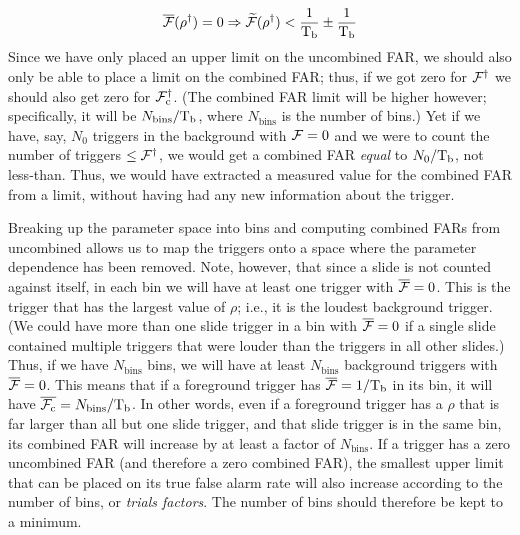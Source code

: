 \begin{equation}
\label{eqn:zeroFAR}
\overline{\far}(\rho^\dagger) = 0 \Rightarrow \widetilde{\far}(\rho^\dagger) < \frac{1}{\Tb} \pm \frac{1}{\Tb}
\end{equation}
Since we have only placed an upper limit on the uncombined \ac{FAR}, we should also only be able to place a limit on the combined \ac{FAR}; thus, if we got zero for $\mathcal{F}^\dagger$ we should also get zero for $\mathcal{F}_{\mathrm{c}}^\dagger$. (The combined \ac{FAR} limit will be higher however; specifically, it will be $N_{\mathrm{bins}}/\mathrm{T_b}$, where $N_{\mathrm{bins}}$ is the number of bins.) Yet if we have, say, $N_0$ triggers in the background with $\mathcal{F} = 0$ and we were to count the number of triggers $\leq \mathcal{F}^\dagger$, we would get a combined \ac{FAR} \emph{equal} to $N_0/\mathrm{T_b}$, not less-than. Thus, we would have extracted a measured value for the combined \ac{FAR} from a limit, without having had any new information about the trigger.

Breaking up the parameter space into bins and computing combined \acp{FAR} from uncombined allows us to map the triggers onto a space where the parameter dependence has been removed. Note, however, that since a slide is not counted against itself, in each bin we will have at least one trigger with $\overline{\mathcal{F}} = 0$. This is the trigger that has the largest value of $\rho$; i.e., it is the loudest background trigger. (We could have more than one slide trigger in a bin with $\overline{\mathcal{F}} = 0$ if a single slide contained multiple triggers that were louder than the triggers in all other slides.) Thus, if we have $N_{\mathrm{bins}}$ bins, we will have at least $N_{\mathrm{bins}}$ background triggers with $\overline{\mathcal{F}} = 0$. This means that if a foreground trigger has $\overline{\mathcal{F}} = 1/\mathrm{T_b}$ in its bin, it will have $\overline{\mathcal{F}_{\mathrm{c}}} = N_{\mathrm{bins}}/\mathrm{T_b}$. In other words, even if a foreground trigger has a $\rho$ that is far larger than all but one slide trigger, and that slide trigger is in the same bin, its combined \ac{FAR} will increase by at least a factor of $N_{\mathrm{bins}}$. If a trigger has a zero uncombined \ac{FAR} (and therefore a zero combined \ac{FAR}), the smallest upper limit that can be placed on its true false alarm rate will also increase according to the number of bins, or \emph{trials factors}. The number of bins should therefore be kept to a minimum.

